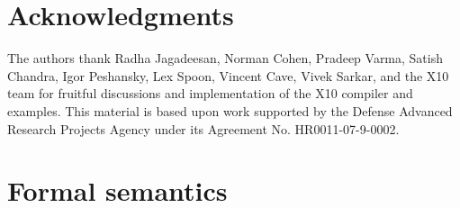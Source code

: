 \documentclass{llncs}
\begin{document}
\section*{Acknowledgments}

The authors thank Radha Jagadeesan,
Norman Cohen, Pradeep Varma,
Satish Chandra, Igor Peshansky,
Lex Spoon, Vincent Cave, Vivek Sarkar,
and the X10 team for fruitful discussions and implementation of
the X10 compiler and examples.
This material is based upon work supported by the Defense
Advanced Research Projects Agency under its Agreement No.
HR0011-07-9-0002.
\fi





\appendix

\section{Formal semantics}
\label{sec:semantics}



% 
\end{document}
